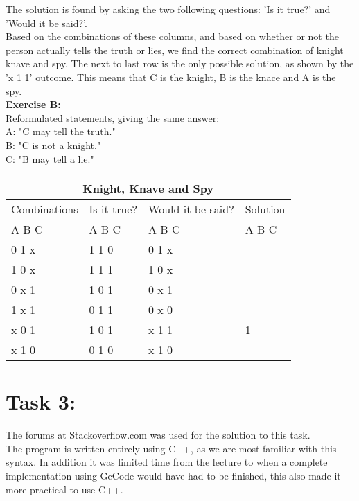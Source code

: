 \documentclass[11pt]{amsart}
\begin{document}
The solution is found by asking the two following questions: 'Is it true?' and 'Would it be said?'. \\

Based on the combinations of these columns, and based on whether or not the person actually tells the truth or lies,
we find the correct combination of knight knave and spy. The next to last row is the only possible solution,
as shown by the 'x 1 1' outcome. This means that C is the knight, B is the knace and A is the spy. \\


\textbf{Exercise B:} \\
Reformulated statements, giving the same answer:\\

	A: "C may tell the truth."\\
	B: "C is not a knight."\\
	C: "B may tell a lie." \\


\begin{tabular}{ |p{3cm}||p{3cm}|p{3cm}|p{3cm}|  }
	\hline
	\multicolumn{4}{|c|}{Knight, Knave and Spy} \\
	\hline
	 Combinations & Is it true? & Would it be said? & Solution  \\ A  B  C   &   A  B  C  &   A  B  C & A  B  C \\
	\hline
	  0   1   x  	& 1	1	0   & 0 1 x	&  \\
	  1   0   x		& 1	1	1  	& 1 0 x &  \\
	  0   x   1 	&	1	0	1 	& 0 x 1	&  \\
	  1   x   1  	&	0	1	1 	& 0 x 0	&  \\
	  x   0   1		& 1	0	1  	& x 1 1	& 1\\
	  x   1   0		& 0	1	0  	& x 1 0 &  \\

	\hline
\end{tabular}


\section{Task 3:}

The forums at Stackoverflow.com was used for the solution to this task. \\

The program is written entirely using C++, as we are most familiar with this syntax.
In addition it was limited time from the lecture to when a complete
implementation using GeCode would have had to be finished, this also made it more practical to use C++. \\
\end{document}
